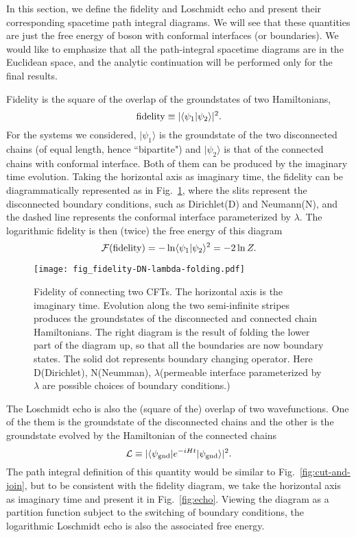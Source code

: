 
In this section, we define the fidelity and Loschmidt echo and present their corresponding spacetime path integral diagrams. We will see that these quantities are just the free energy of boson with conformal interfaces (or boundaries). {\color{red}We would like to emphasize that all the path-integral spacetime diagrams are in the Euclidean space, and the analytic continuation will be performed only for the final results.}

Fidelity is the square of the overlap of the groundstates of two Hamiltonians, 
\begin{equation}
{\rm fidelity} \equiv |\langle \psi_1 |\psi_2  \rangle |^2 .
\end{equation}
For the systems we considered, $|\psi_1 \rangle$ is the groundstate of the two disconnected chains (of equal length, hence ``bipartite") and $|\psi_2\rangle$ is that of the connected chains with conformal interface. Both of them can be produced by the imaginary time evolution. Taking the horizontal axis as imaginary time, the fidelity can be diagrammatically represented as in Fig.~\ref{fig:fidel}, where the slits represent the disconnected boundary conditions, such as Dirichlet(D) and Neumann(N), and the dashed line represents the conformal interface parameterized by $\lambda$. The logarithmic fidelity is then (twice) the free energy of this diagram
\begin{equation}
\mathcal{F}( {\rm fidelity} )  = - \ln \langle \psi_1 |\psi_2 \rangle^2 = - 2 \ln Z.
\end{equation}

\begin{figure}[h]
\texttt{[image: fig\_fidelity-DN-lambda-folding.pdf]}
\caption{Fidelity of connecting two CFTs. The horizontal axis is the imaginary time. Evolution along the two semi-infinite stripes produces the groundstates of the disconnected and connected chain Hamiltonians. The right diagram is the result of folding the lower part of the diagram up, so that all the boundaries are now boundary states. The solid dot represents boundary changing operator. Here D(Dirichlet), N(Neumman), $\lambda$(permeable interface parameterized by $\lambda$ are possible choices of boundary conditions.)}
\label{fig:fidel}
\end{figure}

The Loschmidt echo is also the (square of the) overlap of two wavefunctions. One of the them is the groundstate of the disconnected chains and the other is the groundstate evolved by the Hamiltonian of the connected chains
\begin{equation}
\mathcal{L} \equiv |\langle \psi_{\rm gnd}  | e^{-i H t } | \psi_{\rm gnd} \rangle|^2 .
\end{equation}
The path integral definition of this quantity would be similar to Fig.~\ref{fig:cut-and-join}, but to be consistent with the fidelity diagram, we take the horizontal axis as imaginary time and present it in Fig.~\ref{fig:echo}. Viewing the diagram as a partition function subject to the switching of boundary conditions, the logarithmic Loschmidt echo is also the associated free energy.

